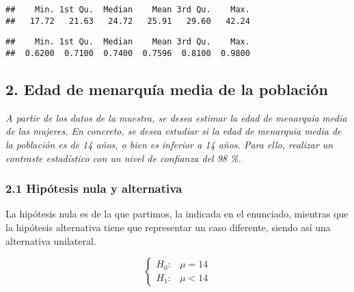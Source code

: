 \documentclass[
]{article}
\newenvironment{Shaded}{\begin{snugshade}}{\end{snugshade}}
\newcommand{\KeywordTok}[1]{\textcolor[rgb]{0.13,0.29,0.53}{\textbf{#1}}}
\newcommand{\NormalTok}[1]{#1}
\newcommand{\OperatorTok}[1]{\textcolor[rgb]{0.81,0.36,0.00}{\textbf{#1}}}
\begin{document}
\begin{Shaded}
\end{Shaded}

\begin{verbatim}
##    Min. 1st Qu.  Median    Mean 3rd Qu.    Max. 
##   17.72   21.63   24.72   25.91   29.60   42.24
\end{verbatim}

\begin{Shaded}
\end{Shaded}

\begin{verbatim}
##    Min. 1st Qu.  Median    Mean 3rd Qu.    Max. 
##  0.6200  0.7100  0.7400  0.7596  0.8100  0.9800
\end{verbatim}

\hypertarget{edad-de-menarquuxeda-media-de-la-poblaciuxf3n}{%
\subsection{2. Edad de menarquía media de la
población}\label{edad-de-menarquuxeda-media-de-la-poblaciuxf3n}}

\emph{A partir de los datos de la muestra, se desea estimar la edad de
menarquia media de las mujeres. En concreto, se desea estudiar si la
edad de menarquia media de la población es de 14 años, o bien es
inferior a 14 años. Para ello, realizar un contraste estadístico con un
nivel de confianza del 98 \%.}

\hypertarget{hipuxf3tesis-nula-y-alternativa}{%
\subsubsection{2.1 Hipótesis nula y
alternativa}\label{hipuxf3tesis-nula-y-alternativa}}

La hipótesis nula es de la que partimos, la indicada en el enunciado,
mientras que la hipótesis alternativa tiene que representar un caso
diferente, siendo así una alternativa unilateral.

\[
\left\{
  \begin{array}{ll}
    H_{0}: &  \mu=14\\
    H_{1}: & \mu< 14
  \end{array}
\right.
\]
\end{document}
